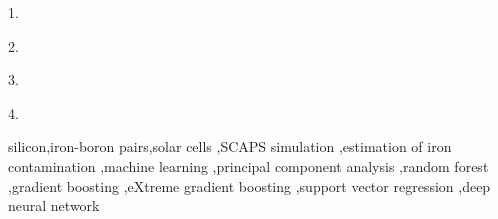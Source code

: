 \documentclass[a4paper,fleqn]{cas-sc}
\begin{document}

\begin{highlights}
\item 1.
\item 2.
\item 3.
\item 4.
\end{highlights}


\begin{keywords}
 silicon\sep iron-boron pairs\sep solar cells \sep SCAPS simulation \sep estimation of iron contamination \sep machine learning \sep principal component analysis \sep random forest \sep gradient boosting \sep eXtreme gradient boosting \sep support vector regression \sep deep neural network
\end{keywords}

\maketitle

\end{document}
